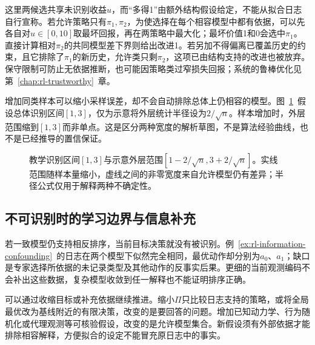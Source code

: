 这里两候选共享未识别收益$u$，而“多得1”由额外结构假设给定，不能从拟合日志自行宣称。若允许策略只有$\pi_1,\pi_2$，为使选择在每个相容模型中都有依据，可以先各自对$u\in[0,10]$取最坏回报，再在两策略中最大化；最坏价值1和0会选中$\pi_1$。直接计算相对$\pi_2$的共同模型差下界则给出改进1。若另加不得偏离已覆盖历史的约束，且它排除了$\pi_1$的新历史，允许类只剩$\pi_2$，这项已由结构支持的改进也被放弃。保守限制可防止无依据推断，也可能因策略类过窄损失回报；系统的鲁棒优化见第~\ref{chap:rl-trustworthy}~章。

增加同类样本可以缩小采样误差，却不会自动排除总体上仍相容的模型。图~\ref{fig:rl-information-identification-width}~假设总体识别区间$[1,3]$，仅为示意将外层统计半径设为$2/\sqrt n$。样本增加时，外层范围缩到$[1,3]$而非单点。这是区分两种宽度的解析草图，不是算法经验曲线，也不是已经推导的置信保证。

\begin{figure}[htbp]
  \centering
  
  \caption{教学识别区间$[1,3]$与示意外层范围$[1-2/\sqrt n,3+2/\sqrt n]$。实线范围随样本量缩小，虚线之间的非零宽度来自允许模型仍有差异；半径公式仅用于解释两种不确定性。}
  \label{fig:rl-information-identification-width}
\end{figure}

\subsection{不可识别时的学习边界与信息补充}
\label{sec:rl-information-unidentifiable}

若一致模型仍支持相反排序，当前目标决策就没有被识别。例~\ref{ex:rl-information-confounding}~的日志在两个模型下似然完全相同，最优动作却分别为$a_0$、$a_1$；缺口是专家选择所依据的未记录类型及其他动作的反事实后果。更细的当前观测编码不会补出这些数据，复杂模型收敛到任一解释也不能证明排序正确。

可以通过收缩目标或补充依据继续推进。缩小$\Pi$只比较日志支持的策略，或将全局最优改为基线附近的有限决策，改变的是要回答的问题。增加已知动力学、行为随机化或代理观测等可核验假设，改变的是允许模型集合。新假设须有外部依据才能排除相容解释，方便拟合的设定不能冒充原日志中的事实。

